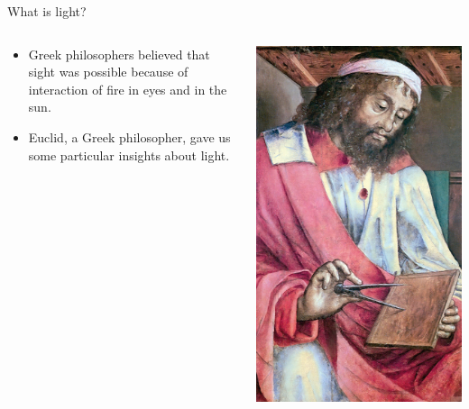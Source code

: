 \begin{frame}{What is light?}
  \begin{columns}
    \begin{column}{0.7\textwidth}
      \begin{itemize}
        \item Greek philosophers believed that sight was possible because of interaction of fire in eyes and in the sun.
        \item Euclid, a Greek philosopher, gave  us some particular insights about light.
      \end{itemize}
    \end{column}
    \begin{column}{0.3\textwidth}
      \includegraphics[width=\columnwidth]{media/Euklid.jpg}
    \end{column}
  \end{columns}
\end{frame}

